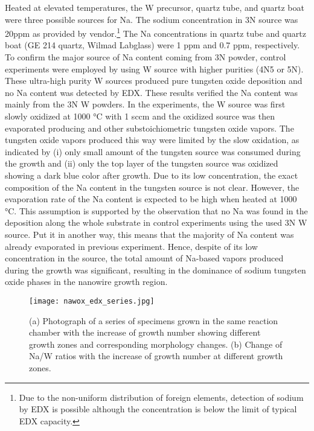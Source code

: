 Heated at elevated temperatures, the W precursor, quartz tube, and quartz boat were three possible sources for Na. The sodium concentration in 3N source was 20ppm as provided by vendor.\footnote{Due to the non-uniform distribution of foreign elements, detection of sodium by EDX is possible although the concentration is below the limit of typical EDX capacity.} The Na concentrations in quartz tube and quartz boat (GE 214 quartz, Wilmad Labglass) were 1 ppm and 0.7 ppm,  respectively. To confirm the major source of Na content coming from 3N powder, control experiments were employed by using W source with higher purities (4N5 or 5N). These ultra-high purity W sources produced pure tungsten oxide deposition and no Na content was detected by EDX. These results verified the Na content was mainly from the 3N W powders. In the experiments, the W source was first slowly oxidized at 1000 \si{\degreeCelsius} with 1 sccm  and the oxidized source was then evaporated producing  and other substoichiometric tungsten oxide vapors. The tungsten oxide vapors produced this way were limited by the slow oxidation, as indicated by (i) only small amount of the tungsten source was consumed during the growth and (ii) only the top layer of the tungsten source was oxidized showing a dark blue color after growth. Due to its low concentration, the exact composition of the Na content in the tungsten source is not clear. However, the evaporation rate of the Na content is expected to be high when heated at 1000 \si{\degreeCelsius}. This assumption is supported by the observation that no Na was found in the deposition along the whole substrate in control experiments using the used 3N W source. Put it in another way, this means that the majority of Na content was already evaporated in previous experiment. Hence, despite of its low concentration in the source, the total amount of Na-based vapors produced during the growth was significant, resulting in the dominance of sodium tungsten oxide phases in the nanowire growth region.

\begin{figure}[htb]
\centering
\texttt{[image: nawox\_edx\_series.jpg]}
\caption[Photograph of a series of 3N growth]{(a) Photograph of a series of specimens grown in the same reaction chamber with the increase of growth number showing different growth zones and corresponding morphology changes. (b) Change of Na/W ratios with the increase of growth number at different growth zones.}
\label{fig:nawoxser}
\end{figure}

